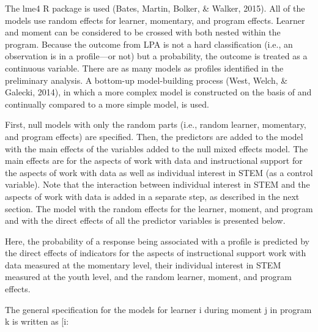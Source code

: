 \documentclass[]{msu-thesis}
\theoremstyle{definition}
\theoremstyle{definition}
\theoremstyle{definition}
\theoremstyle{remark}
\begin{document}
The lme4 R package is used (Bates, Martin, Bolker, \& Walker, 2015). All
of the models use random effects for learner, momentary, and program
effects. Learner and moment can be considered to be crossed with both
nested within the program. Because the outcome from LPA is not a hard
classification (i.e., an observation is in a profile---or not) but a
probability, the outcome is treated as a continuous variable. There are
as many models as profiles identified in the preliminary analysis. A
bottom-up model-building process (West, Welch, \& Galecki, 2014), in
which a more complex model is constructed on the basis of and
continually compared to a more simple model, is used.

First, null models with only the random parts (i.e., random learner,
momentary, and program effects) are specified. Then, the predictors are
added to the model with the main effects of the variables added to the
null mixed effects model. The main effects are for the aspects of work
with data and instructional support for the aspects of work with data as
well as individual interest in STEM (as a control variable). Note that
the interaction between individual interest in STEM and the aspects of
work with data is added in a separate step, as described in the next
section. The model with the random effects for the learner, moment, and
program and with the direct effects of all the predictor variables is
presented below.

Here, the probability of a response being associated with a profile is
predicted by the direct effects of indicators for the aspects of
instructional support work with data measured at the momentary level,
their individual interest in STEM measured at the youth level, and the
random learner, moment, and program effects.

The general specification for the models for learner i during moment j
in program k is written as {[}i:
\end{document}
